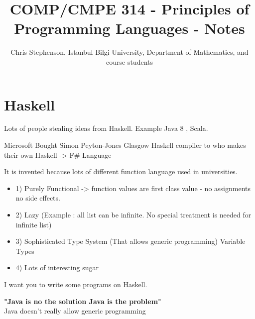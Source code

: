 \documentclass{article}
\begin{document}
\title{COMP/CMPE 314 - Principles of Programming Languages - Notes}
\author{Chris Stephenson, Istanbul Bilgi University, Department of Mathematics, and course students}
\maketitle

\section*{Haskell}
Lots of people stealing ideas from Haskell. Example Java 8 , Scala.

Microsoft Bought Simon Peyton-Jones Glasgow Haskell compiler to who makes their own Haskell -> F# Language

It is invented because lots of different function language used in universities.
\begin{itemize}

 \item 1) Purely Functional -> function values
are first class value
- no assignments no side effects.

 \item 2) Lazy (Example : all list can be infinite. No special treatment is needed for infinite list)

 \item 3) Sophisticated Type System (That allows generic programming)
Variable Types

 \item 4) Lots of interesting sugar
\end{itemize}

I want you to write some programs on Haskell.
\bigskip

\textbf {"Java is no the solution
Java is the problem"} \\


Java doesn't really allow generic programming\\
\end{document}

